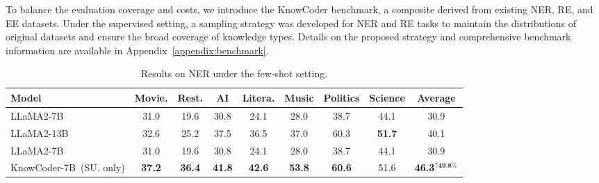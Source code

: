To balance the evaluation coverage and costs, we introduce the KnowCoder benchmark, a composite derived from existing NER, RE, and EE datasets. Under the supervised setting, a sampling strategy was developed for NER and RE tasks to maintain the distributions of original datasets and ensure the broad coverage of knowledge types. Details on the proposed strategy and comprehensive benchmark information are available in Appendix~\ref{appendix:benchmark}. 

\begin{table*}
  \small
  \centering
  \setlength\tabcolsep{2pt}  %
  \resizebox{0.8\linewidth}{!}
  {\begin{tabular}{@{}l|ccccccc|c@{}}
  \toprule
  \textbf{Model} &
  \textbf{Movie.} &
  \textbf{Rest.} &
  \textbf{AI} &
  \textbf{Litera.} &
  \textbf{Music} &
  \textbf{Politics} &
  \textbf{Science} &
  \textbf{Average} \\ \midrule

  LLaMA2-7B & 31.0 & 19.6 & 30.8 & 24.1 & 28.0 & 38.7 & 44.1 & 30.9 \\
  LLaMA2-13B  & 32.6 & 25.2 & 37.5 & 36.5 & 37.0 & 60.3 & \textbf{51.7} & 40.1 \\

  \midrule
  LLaMA2-7B & 31.0 & 19.6 & 30.8 & 24.1 & 28.0 & 38.7 & 44.1 & 30.9 \\
  KnowCoder-7B~(SU. only)   & \textbf{37.2}& \textbf{36.4} & \textbf{41.8} & \textbf{42.6} & \textbf{53.8} & \textbf{60.6} & 51.6 & \textbf{46.3}$^{\uparrow\textbf{49.8\%}}$ \\

  \bottomrule
  \end{tabular}}
  \caption{Results on NER under the few-shot setting.}
  \label{tab:fewshot-ner-results-table}
\end{table*}


